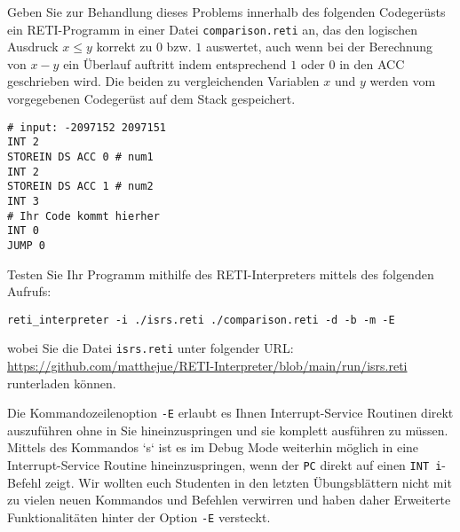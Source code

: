 \documentclass{article}
\begin{document}
Geben Sie zur Behandlung dieses Problems innerhalb des folgenden Codegerüsts ein RETI-Programm in einer Datei \verb|comparison.reti| an, das den logischen Ausdruck $x \le y$ korrekt zu $0$ bzw. $1$ auswertet, auch wenn bei der Berechnung von $x - y$ ein Überlauf auftritt indem entsprechend $1$ oder $0$ in den ACC geschrieben wird. Die beiden zu vergleichenden Variablen $x$ und $y$ werden vom vorgegebenen Codegerüst auf dem Stack gespeichert. %

\begin{verbatim}
# input: -2097152 2097151
INT 2
STOREIN DS ACC 0 # num1
INT 2
STOREIN DS ACC 1 # num2
INT 3
# Ihr Code kommt hierher 
INT 0
JUMP 0
\end{verbatim}

Testen Sie Ihr Programm mithilfe des RETI-Interpreters mittels des folgenden Aufrufs:

\begin{verbatim}
reti_interpreter -i ./isrs.reti ./comparison.reti -d -b -m -E
\end{verbatim}

wobei Sie die Datei \verb|isrs.reti| unter folgender URL: \href{https://github.com/matthejue/RETI-Interpreter/blob/main/run/isrs.reti}{https://github.com/matthejue/RETI-Interpreter/blob/main/run/isrs.reti} runterladen können.

Die Kommandozeilenoption \verb|-E| erlaubt es Ihnen Interrupt-Service Routinen direkt auszuführen ohne in Sie hineinzuspringen und sie komplett ausführen zu müssen. Mittels des Kommandos `s` ist es im Debug Mode weiterhin möglich in eine Interrupt-Service Routine hineinzuspringen, wenn der \verb|PC| direkt auf einen \verb|INT i|-Befehl zeigt. Wir wollten euch Studenten in den letzten Übungsblättern nicht mit zu vielen neuen Kommandos und Befehlen verwirren und haben daher Erweiterte Funktionalitäten hinter der Option \verb|-E| versteckt.
\end{document}
